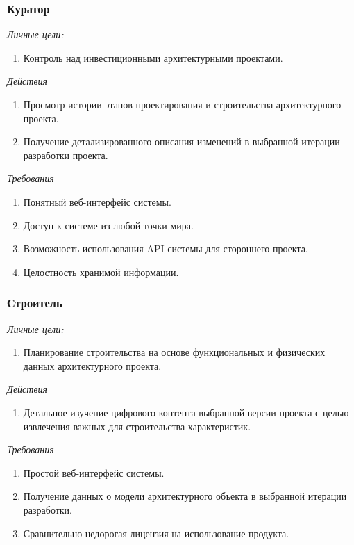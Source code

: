 \documentclass[a4paper,14pt]{extreport} %
\begin{document}
\subsubsection{Куратор}

\textit{Личные цели:}
\begin{enumerate}
\item Контроль над инвестиционными архитектурными проектами.
\end{enumerate}
\textit{Действия}
\begin{enumerate}
\item Просмотр истории этапов проектирования и строительства архитектурного проекта.
\item Получение детализированного описания изменений в выбранной итерации разработки проекта.
\end{enumerate}
\textit{Требования}
\begin{enumerate}
\item Понятный веб-интерфейс системы.
\item Доступ к системе из любой точки мира.
\item Возможность использования API системы для стороннего проекта.
\item Целостность хранимой информации.
\end{enumerate}

\subsubsection{Строитель}

\textit{Личные цели:}
\begin{enumerate}
\item Планирование строительства на основе функциональных и физических данных архитектурного проекта.
\end{enumerate}
\textit{Действия}
\begin{enumerate}
\item Детальное изучение цифрового контента выбранной версии проекта с целью извлечения важных для строительства характеристик.
\end{enumerate}
\textit{Требования}
\begin{enumerate}
\item Простой веб-интерфейс системы.
\item Получение данных о модели архитектурного объекта в выбранной итерации разработки.
\item Сравнительно недорогая лицензия на использование продукта.
\end{enumerate}
\end{document}

